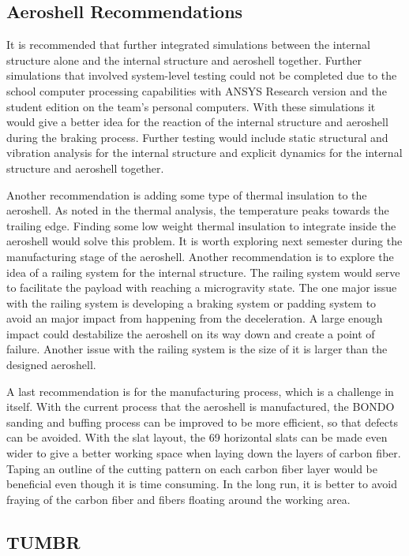 \subsection*{Aeroshell Recommendations}

\indent\indent It is recommended that further integrated simulations between the internal structure alone and the internal structure and aeroshell together. Further simulations that involved system-level testing could not be completed due to the school computer processing capabilities with ANSYS Research version and the student edition on the team's personal computers. With these simulations it would give a better idea for the reaction of the internal structure and aeroshell during the braking process. Further testing would include static structural and vibration analysis for the internal structure and explicit dynamics for the internal structure and aeroshell together.

Another recommendation is adding some type of thermal insulation to the aeroshell. As noted in the thermal analysis, the temperature peaks towards the trailing edge. Finding some low weight thermal insulation to integrate inside the aeroshell would solve this problem. It is worth exploring next semester during the manufacturing stage of the aeroshell. Another recommendation is to explore the idea of a railing system for the internal structure. The railing system would serve to facilitate the payload with reaching a microgravity state. The one major issue with the railing system is developing a braking system or padding system to avoid an major impact from happening from the deceleration. A large enough impact could destabilize the aeroshell on its way down and create a point of failure. Another issue with the railing system is the size of it is larger than the designed aeroshell.

A last recommendation is for the manufacturing process, which is a challenge in itself. With the current process that the aeroshell is manufactured, the BONDO sanding and buffing process can be improved to be more efficient, so that defects can be avoided. With the slat layout, the 69 horizontal slats can be made even wider to give a better working space when laying down the layers of carbon fiber. Taping an outline of the cutting pattern on each carbon fiber layer would be beneficial even though it is time consuming. In the long run, it is better to avoid fraying of the carbon fiber and fibers floating around the working area.

\subsection{TUMBR}


